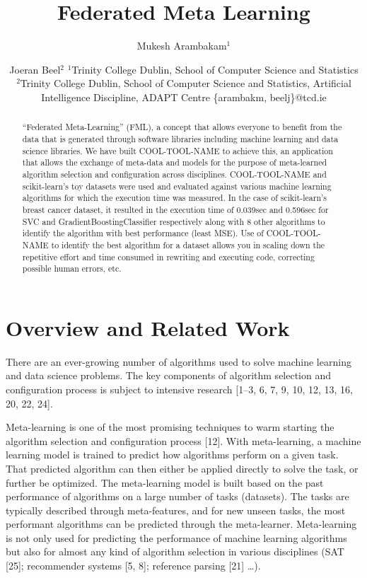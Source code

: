 \documentclass{article}
\title{Federated Meta Learning}
\author{
Mukesh Arambakam$^1$
\and
Joeran Beel$^2$
\affiliations
$^1$Trinity College Dublin,
School of Computer Science and Statistics\\
$^2$Trinity College Dublin,
School of Computer Science and Statistics,
Artificial Intelligence Discipline,
ADAPT Centre
\emails
\{arambakm, beelj\}@tcd.ie
}
\begin{document}
\maketitle

\begin{abstract}
“Federated Meta-Learning” (FML), a concept that allows everyone to benefit from the data that is generated through software libraries including machine learning and data science libraries. We have built COOL-TOOL-NAME to achieve this, an application that allows the exchange of meta-data and models for the purpose of meta-learned algorithm selection and configuration across disciplines. COOL-TOOL-NAME and scikit-learn's toy datasets were used and evaluated against various machine learning algorithms for which the execution time was measured. In the case of scikit-learn’s breast cancer dataset, it resulted in the execution time of 0.039sec and 0.596sec for SVC and GradientBoostingClassifier respectively along with 8 other algorithms to identify the algorithm with best performance (least MSE). Use of COOL-TOOL-NAME to identify the best algorithm for a dataset allows you in scaling down the repetitive effort and time consumed in rewriting and executing code, correcting possible human errors, etc.
\end{abstract}

\section{Overview and Related Work}
There are an ever-growing number of algorithms used to solve machine learning and data science problems. The key components of algorithm selection and configuration process is subject to intensive research [1–3, 6, 7, 9, 10, 12, 13, 16, 20, 22, 24]. 

Meta-learning is one of the most promising techniques to warm starting the algorithm selection and configuration process [12]. With meta-learning, a machine learning model is trained to predict how algorithms perform on a given task. That predicted algorithm can then either be applied directly to solve the task, or further be optimized. The meta-learning model is built based on the past performance of algorithms on a large number of tasks (datasets). The tasks are typically described through meta-features, and for new unseen tasks, the most performant algorithms can be predicted through the meta-learner. Meta-learning is not only used for predicting the performance of machine learning algorithms but also for almost any kind of algorithm selection in various disciplines (SAT [25]; recommender systems [5, 8]; reference parsing [21] …).
\end{document}
